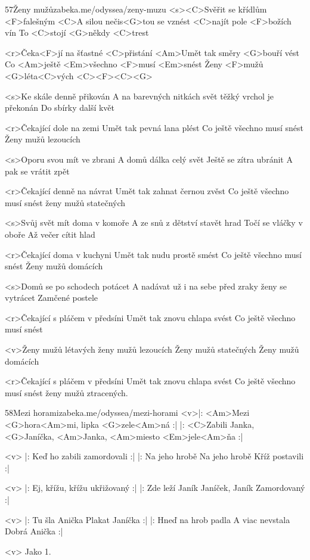 \begin{song}[Epydemye]{57}{Ženy mužů}{zabeka.me/odyssea/zeny-muzu}
	<s><C>Svěřit se křídlům <F>falešným
	<C>A silou nečis<G>tou se vznést
	<C>najít pole <F>božích vín
	To <C>stojí <G>někdy <C>trest

	<r>Čeka<F>jí na šťastné <C>přistání
	<Am>Umět tak směry <G>bouří vést
	Co <Am>ještě <Em>všechno <F>musí <Em>snést
	Ženy <F>mužů <G>léta<C>vých <C><F><C><G>

	<s>Ke skále denně přikován
	A na barevných nitkách svět
	těžký vrchol je překonán
	Do sbírky další květ

	<r>Čekající dole na zemi
	Umět tak pevná lana plést
	Co ještě všechno musí snést
	Ženy mužů lezoucích

	<s>Oporu svou mít ve zbrani
	A domů dálka celý svět
	Ještě se zítra ubránit
	A pak se vrátit zpět

	<r>Čekající denně na návrat
	Umět tak zahnat černou zvěst
	Co ještě všechno musí snést
	ženy mužů statečných

	<s>Svůj svět mít doma v komoře
	A ze snů z dětství stavět hrad
	Točí se vláčky v oboře
	Až večer cítit hlad

	<r>Čekající doma v kuchyni
	Umět tak nudu prostě smést
	Co ještě všechno musí snést
	Ženy mužů domácích

	<s>Domů se po schodech potácet
	A nadávat už i na sebe
	před zraky ženy se vytrácet
	Zamčené postele

	<r>Čekající s pláčem v předsíni
	Umět tak znovu chlapa svést
	Co ještě všechno musí snést

	<v>Ženy mužů létavých
	ženy mužů lezoucích
	Ženy mužů statečných
	Ženy mužů domácích

	<r>Čekající s pláčem v předsíni
	Umět tak znovu chlapa svést
	Co ještě všechno musí snést
	ženy mužů ztracených.
\end{song}
\begin{song}[Čechomor]{58}{Mezi horami}{zabeka.me/odyssea/mezi-horami}
	<v>|: <Am>Mezi <G>hora<Am>mi, lipka <G>zele<Am>ná :|
	|: <C>Zabili Janka, <G>Janíčka, <Am>Janka, <Am>miesto <Em>jele<Am>ňa :|

	<v> |: Keď ho zabili
	zamordovali :|
	|: Na jeho hrobě
	Na jeho hrobě
	Kříž postavili :|

	<v> |: Ej, křížu, křížu
	ukřižovaný :|
	|: Zde leží Janík
	Janíček, Janík
	Zamordovaný :|

	<v> |: Tu šla Anička
	Plakat Janíčka :|
	|: Hneď na hrob padla
	A viac nevstala
	Dobrá Anička :|

	<v> Jako 1.
\end{song}
